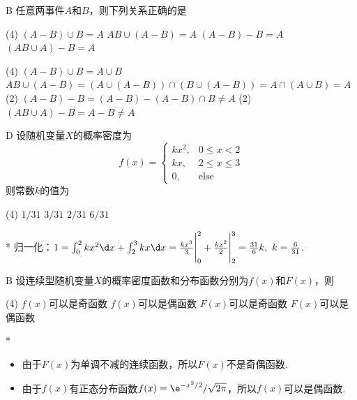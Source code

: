 \begin{choice}{B}
    任意两事件$A$和$B$，则下列关系正确的是
    \begin{tasks}(4)
        \task $(A-B)\cup B=A$
        \task $AB\cup(A-B)=A$
        \task $(A-B)-B=A$
        \task $(AB\cup A)-B=A$
    \end{tasks}
\end{choice}
\begin{solution}
    \begin{tasks}(4)
        \task $(A-B)\cup B=A\cup B$
        \task* $AB\cup(A-B)=(A\cup(A-B))\cap(B\cup(A-B))=A\cap(A\cup B)=A$
        \task*(2) $(A-B)-B=(A-B)-(A-B)\cap B\neq A$
        \task*(2) $(AB\cup A)-B=A-B\neq A$
    \end{tasks}
\end{solution}

\begin{choice}{D}
    设随机变量$X$的概率密度为
    \[f(x)=\begin{cases}
        kx^2, & 0\leq x<2\\
        kx, & 2\leq x\leq 3\\
        0, & \text{else}
    \end{cases}\]
    则常数$k$的值为
    \begin{tasks}(4)
        \task $1/31$
        \task $3/31$
        \task $2/31$
        \task $6/31$
    \end{tasks}
\end{choice}
\begin{solution}*
    归一化：$1=\int_0^2kx^2\d x+\int_2^3kx\d x=\frac{kx^3}{3}\Bigg|_0^2+\frac{kx^2}{2}\Bigg|_2^3=\frac{31}{6}k,\ k=\frac{6}{31}$. 
\end{solution}

\begin{choice}{B}
    设连续型随机变量$X$的概率密度函数和分布函数分别为$f(x)$和$F(x)$，则
    \begin{tasks}(4)
        \task $f(x)$可以是奇函数
        \task $f(x)$可以是偶函数
        \task $F(x)$可以是奇函数
        \task $F(x)$可以是偶函数
    \end{tasks}
\end{choice}
\begin{solution}*
    \begin{itemize}
        \item 由于$F(x)$为单调不减的连续函数，所以$F(x)$不是奇偶函数.
        \item 由于$f(x)$有正态分布函数$f(x)=\e^{-x^2/2}/\sqrt{2\pi}$，所以$f(x)$可以是偶函数. 
    \end{itemize}
\end{solution}

